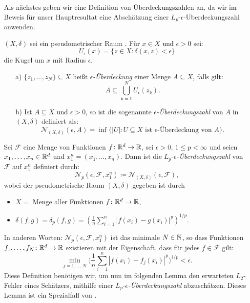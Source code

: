 Als nächstes geben wir eine Definition von Überdeckungszahlen an, da wir im Beweis für unser Hauptresultat eine Abschätzung einer $L_p\text{-}\epsilon$-Überdeckungszahl anwenden.
\begin{defn}
\label{ueberdeckung}
$(X, \delta)$ sei ein pseudometrischer Raum \cite[Definition 2.1.1]{Topologie2015} . Für $x \in X$ und $\epsilon > 0$ sei:
$$U_{\epsilon}(x) = \{z \in X : \delta(x, z) < \epsilon\}$$
die Kugel um $x$ mit Radius $\epsilon$.
\begin{itemize}
\item[a)] $\{z_1,\dots,z_N\} \subseteq X$ heißt $\epsilon$\textit{-Überdeckung} einer Menge $A \subseteq X$, falls gilt:
$$A \subseteq \bigcup_{k = 1}^N U_{\epsilon}(z_k).$$
\item[b)] Ist $A \subseteq X$ und $\epsilon > 0$, so ist die sogenannte $\epsilon$\textit{-Überdeckungszahl} von $A$ in $(X,\delta)$ definiert als:
$$\mathcal{N}_{(X,\delta)}(\epsilon, A) = \inf\big\{|U| : U \subseteq X \text{ ist } \epsilon\text{-Überdeckung von } A\big\}.$$   
\end{itemize}
\end{defn} 
\begin{defn}
\label{lpe}
Sei $\mathcal{F}$ eine Menge von Funktionen $f\colon \mathbb{R}^d \to \mathbb{R}$, sei $\epsilon > 0$, $1 \leq p < \infty$ und seien $x_1,\dots,x_n \in \mathbb{R}^d$ und $x_1^n = (x_1,\dots,x_n).$ Dann ist die $L_p$-$\epsilon$\textit{-Überdeckungszahl} von $\mathcal{F}$ auf $x_1^n$ definiert durch:
$$\mathcal{N}_p(\epsilon, \mathcal{F}, x_1^n) \coloneqq \mathcal{N}_{(X,\delta)}(\epsilon, \mathcal{F}),$$
wobei der pseudometrische Raum $(X, \delta)$ gegeben ist durch
\begin{itemize}
\item $X = $ Menge aller Funktionen $f\colon \mathbb{R}^d \to \mathbb{R}$,
\item $\delta(f, g) = \delta_p(f, g) = (\frac{1}{n}\sum_{i = 1}^n |f(x_i) - g(x_i)|^p)^{1/p} .$
\end{itemize}
\end{defn}
In anderen Worten: $\mathcal{N}_p(\epsilon, \mathcal{F}, x_1^n)$ ist das minimale $N \in \mathbb{N}$, so dass Funktionen $f_1,\dots,f_N\colon \mathbb{R}^d \to \mathbb{R}$ existieren mit der Eigenschaft, dass für jedes $f \in \mathcal{F}$ gilt:
$$\min_{j = 1,\dots,N}\bigg(\frac{1}{n}\sum_{i = 1}^n|f(x_i) - f_j(x_i)|^p\bigg)^{1/p} < \epsilon.$$
Diese Definition benötigen wir, um nun im folgenden Lemma den erwarteten $L_2$-Fehler eines Schätzers, mithilfe einer $L_p$-$\epsilon$\textit{-Überdeckungszahl} abzuschätzen. Dieses Lemma ist ein Spezialfall von \cite[Lemma 8]{kohler19}.
